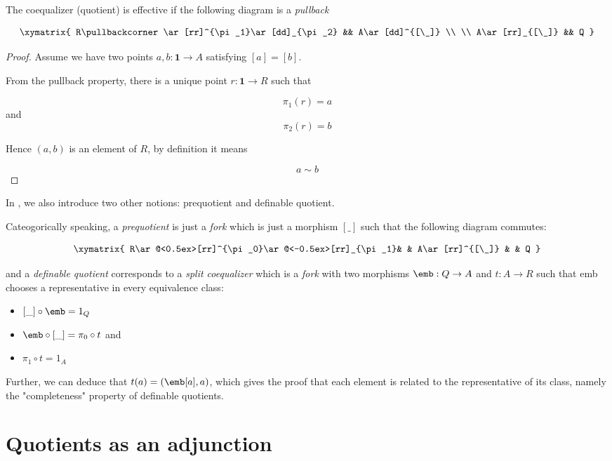 The coequalizer (quotient) is effective if the following diagram is a \emph{pullback}

\[\xymatrix{
R\pullbackcorner\ar[rr]^{\pi_1}\ar[dd]_{\pi_2} && A\ar[dd]^{[\_]} \\ \\
A\ar[rr]_{[\_]} && Q
}\]

\begin{proof}
Assume we have two points $a, b : \textbf{1} \to A$ satisfying $[ a ] = [ b ]$.

From the pullback property, there is a unique point $r : \textbf{1} \to R$ such that

$$\pi_1(r) = a$$ and $$\pi_2(r) = b$$ 

Hence $(a, b)$ is an element of $R$, by definition it means

$$a \sim b$$
\end{proof}

In , we also introduce two other notions: prequotient and definable quotient.

Cateogorically speaking, a \emph{prequotient} is just a \emph{fork} which is just a morphism $[\_]$ such that the following diagram commutes:

\[\xymatrix{
R\ar@<0.5ex>[rr]^{\pi_0}\ar@<-0.5ex>[rr]_{\pi_1}& & A\ar[rr]^{[\_]}
& & Q
}\]

and a \emph{definable quotient} corresponds to a \emph{split coequalizer} which is a \emph{fork} with two morphisms $\emb : Q \to A$ and $t : A \to R$ such that emb chooses a representative in every equivalence class:

\begin{itemize}

\item $[\_] \circ \emb = 1_Q$

\item $\emb \circ [\_]  = \pi_0 \circ t$ and 

\item $\pi_1 \circ t = 1_A$

\end{itemize}

Further, we can deduce that $t(a) = (\emb [ a ] , a)$, which gives the proof that each element is related to the representative of its class, namely the "completeness" property of definable quotients.

\section{Quotients as an adjunction}

